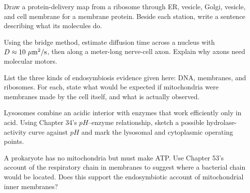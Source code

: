 \begin{sikaoti}
\item Draw a protein-delivery map from a ribosome through ER, vesicle, Golgi, vesicle, and cell membrane for a membrane protein. Beside each station, write a sentence describing what its molecules do.
\item Using the bridge method, estimate diffusion time across a  nucleus with $D\approx10\ \mathrm{\mu m^2/s}$, then along a meter-long nerve-cell axon. Explain why axons need molecular motors.
\item List the three kinds of endosymbiosis evidence given here: DNA, membranes, and ribosomes. For each, state what would be expected if mitochondria were membranes made by the cell itself, and what is actually observed.
\item Lysosomes combine an acidic interior with enzymes that work efficiently only in acid. Using Chapter 34's $pH$--enzyme relationship, sketch a possible hydrolase-activity curve against $pH$ and mark the lysosomal and cytoplasmic operating points.
\item A prokaryote has no mitochondria but must make ATP. Use Chapter 53's account of the respiratory chain in membranes to suggest where a bacterial chain would be located. Does this support the endosymbiotic account of mitochondrial inner membranes?
\end{sikaoti}
